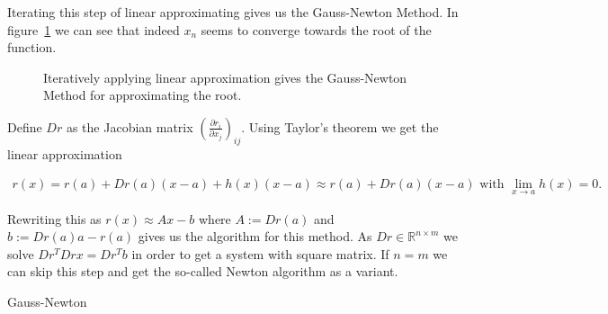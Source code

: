 Iterating this step of linear approximating gives us the Gauss-Newton Method. In figure~\ref{fig:gauss_newton_example} we can see that indeed $x_n$ seems to converge towards the root of the function.

\begin{figure}[h]
	\centering
	\caption{Iteratively applying linear approximation gives the Gauss-Newton Method for approximating the root.}
	\label{fig:gauss_newton_example}
\end{figure}

Define $Dr$ as the Jacobian matrix $\left(\frac{\partial r_i}{\partial x_j}\right)_{ij}$. Using Taylor's theorem we get the linear approximation

\begin{align*}
	r(x) = r(a) + Dr(a)(x-a) + h(x)(x-a) \approx r(a) + Dr(a)(x-a) \text{ with } \lim\limits_{x\rightarrow a}h(x) = 0.
\end{align*}

Rewriting this as $r(x) \approx Ax - b$ where $A := Dr(a)$ and $b := Dr(a)a-r(a)$ gives us the algorithm for this method. As $Dr \in \mathbb{R}^{n\times m}$ we solve $Dr^T Dr x = Dr^T b$ in order to get a system with square matrix. If $n=m$ we can skip this step and get the so-called Newton algorithm as a variant.

\begin{algorithm}[H] \label{alg:gauss_newton}
	\SetAlgoLined
	\DontPrintSemicolon
	\LinesNumbered
	\caption{Gauss-Newton}
	
	\BlankLine
\end{algorithm}
\vspace{1cm}

